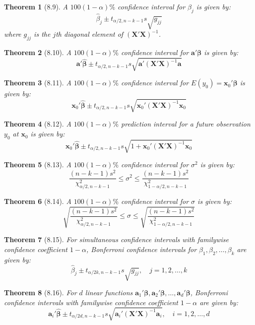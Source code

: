 \documentclass{article}
\newtheorem{theorem}{Theorem}[section]
\begin{document}
\begin{theorem}[8.9]
A $100(1-\alpha)\%$ confidence interval for $\beta_j$ is given by:
\[\hat{\beta}_j \pm t_{\alpha/2,n-k-1}s\sqrt{g_{jj}}\]
where $g_{jj}$ is the $j$th diagonal element of $(\mathbf{X}'\mathbf{X})^{-1}$.
\end{theorem}

\begin{theorem}[8.10] 
A $100(1-\alpha)\%$ confidence interval for $\mathbf{a}'\boldsymbol{\beta}$ is given by:
\[\mathbf{a}'\hat{\boldsymbol{\beta}} \pm t_{\alpha/2,n-k-1}s\sqrt{\mathbf{a}'(\mathbf{X}'\mathbf{X})^{-1}\mathbf{a}}\]
\end{theorem}

\begin{theorem}[8.11]
A $100(1-\alpha)\%$ confidence interval for $E(y_0)=\mathbf{x}_0'\boldsymbol{\beta}$ is given by:
\[\mathbf{x}_0'\hat{\boldsymbol{\beta}} \pm t_{\alpha/2,n-k-1}s\sqrt{\mathbf{x}_0'(\mathbf{X}'\mathbf{X})^{-1}\mathbf{x}_0}\]
\end{theorem}

\begin{theorem}[8.12]
A $100(1-\alpha)\%$ prediction interval for a future observation $y_0$ at $\mathbf{x}_0$ is given by:
\[\mathbf{x}_0'\hat{\boldsymbol{\beta}} \pm t_{\alpha/2,n-k-1}s\sqrt{1 + \mathbf{x}_0'(\mathbf{X}'\mathbf{X})^{-1}\mathbf{x}_0}\]
\end{theorem}

\begin{theorem}[8.13]
A $100(1-\alpha)\%$ confidence interval for $\sigma^2$ is given by:
\[\frac{(n-k-1)s^2}{\chi^2_{\alpha/2,n-k-1}} \leq \sigma^2 \leq \frac{(n-k-1)s^2}{\chi^2_{1-\alpha/2,n-k-1}}\]
\end{theorem}

\begin{theorem}[8.14]
A $100(1-\alpha)\%$ confidence interval for $\sigma$ is given by:
\[\sqrt{\frac{(n-k-1)s^2}{\chi^2_{\alpha/2,n-k-1}}} \leq \sigma \leq \sqrt{\frac{(n-k-1)s^2}{\chi^2_{1-\alpha/2,n-k-1}}}\]
\end{theorem}

\begin{theorem}[8.15]
For simultaneous confidence intervals with familywise confidence coefficient $1-\alpha$, Bonferroni confidence intervals for $\beta_1,\beta_2,\ldots,\beta_k$ are given by:
\[\hat{\beta}_j \pm t_{\alpha/2k,n-k-1}s\sqrt{g_{jj}}, \quad j=1,2,\ldots,k\]
\end{theorem}

\begin{theorem}[8.16]
For $d$ linear functions $\mathbf{a}_1'\boldsymbol{\beta}, \mathbf{a}_2'\boldsymbol{\beta},\ldots,\mathbf{a}_d'\boldsymbol{\beta}$, Bonferroni confidence intervals with familywise confidence coefficient $1-\alpha$ are given by:
\[\mathbf{a}_i'\hat{\boldsymbol{\beta}} \pm t_{\alpha/2d,n-k-1}s\sqrt{\mathbf{a}_i'(\mathbf{X}'\mathbf{X})^{-1}\mathbf{a}_i}, \quad i=1,2,\ldots,d\]
\end{theorem}
\end{document}

